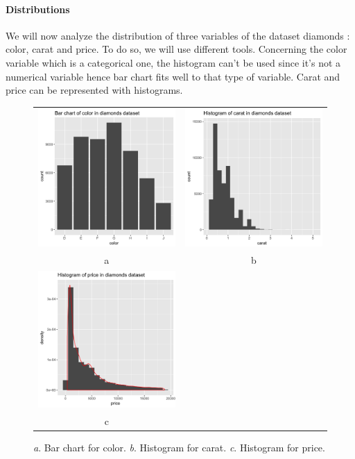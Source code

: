 \documentclass{article}
\begin{document}
\paragraph{Distributions}
We will now analyze the distribution of three variables of the dataset diamonds : color, carat and price.
To do so, we will use different tools. Concerning the color variable which is a categorical one, the histogram can't be used since it's not a numerical variable hence bar chart fits well to that type of variable. Carat and price can be represented with histograms.
\begin{figure}[!ht]
\centering
\begin{tabular}{cc}
	\includegraphics[width=.5\textwidth]{bar_chart_color}&
	\includegraphics[width=.5\textwidth]{histogram_carat}\\
	a&b\\
	\includegraphics[width=.5\textwidth]{histogram_price}\\
	c\\
\end{tabular}
\caption{\textit{a}. Bar chart for color. \textit{b}. Histogram for carat. \textit{c}. Histogram for price.}
\label{diamonds}
\end{figure}
\end{document}
